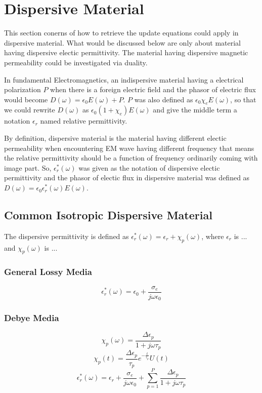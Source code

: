 \section{Dispersive Material}
\label{sec:dispersive}
This section conerns of how to retrieve the update equations could apply in dispersive material. What would be discussed
below are only about material having dispersive electic permittivity. The material having dispersive magnetic
permeability could be investigated via duality.

In fundamental Electromagnetics, an indispersive material having a electrical polarization $P$ when there is a foreign
electric field and the phasor of electric flux would become $D(\omega) = \epsilon_0 E(\omega) + P$. $P$ was also defined
as $\epsilon_0 \chi_e E(\omega)$, so that we could rewrite $D(\omega)$ as $\epsilon_0 (1+\chi_e)E(\omega)$ and give the middle term a notation
$\epsilon_r$ named relative permittivity.

By definition, dispersive material is the material having different electic permeability when encountering EM wave
having different frequency that means the relative permittivity should be a function of frequency ordinarily coming with
image part. So, $\epsilon_r^*(\omega)$ was given as the notation of dispersive electic permittivity and the phasor of
electic flux in dispersive material was defined as $D(\omega) = \epsilon_0 \epsilon_r^*(\omega)E(\omega)$.
\subsection{Common Isotropic Dispersive Material}
The dispersive permittivity is defined as $\epsilon_r^*(\omega) = \epsilon_r + \chi_p(\omega)$, where
$\epsilon_r$ is ... and $\chi_p(\omega)$ is ...
\subsubsection{General Lossy Media}
\begin{equation}
  \epsilon_r^*(\omega) = \epsilon_0 + \frac{\sigma_e}{j\omega\epsilon_0}
\end{equation}

\subsubsection{Debye Media}
\begin{equation}
  \chi_p(\omega) = \frac{\Delta\epsilon_p}{1+j\omega\tau_p}  
\end{equation}
\begin{equation}
  \chi_p(t) = \frac{\Delta \epsilon_p}{\tau_p} e^{-\frac{t}{\tau_p}}U(t)  
\end{equation}
\begin{equation}
  \epsilon_r^*(\omega) = \epsilon_r + \frac{\sigma_e}{j\omega\epsilon_0} + \sum_{p=1}^P \frac{\Delta\epsilon_p}{1+j\omega\tau_p}  
\end{equation}



